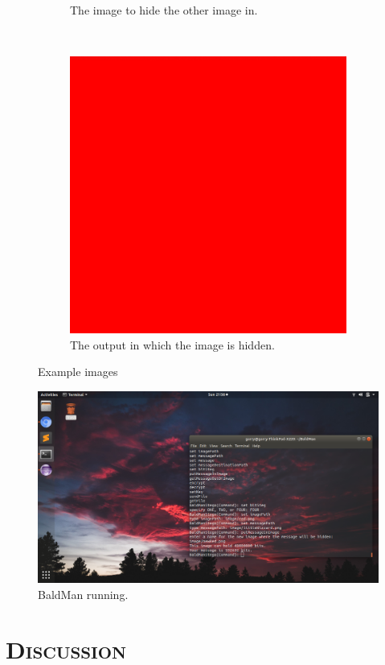 \documentclass[12pt]{article}
\begin{document}
\begin{figure}[h]
\begin{subfigure}[t]{0.3\textwidth}
			\caption{The image to hide the other image in.}
		\end{subfigure}
		~
		\begin{subfigure}[t]{0.3\textwidth}
			\includegraphics[width=\textwidth]{image/newRed.png}
			\caption{The output in which the image is hidden.}
		\end{subfigure}
		\caption{Example images}
	\end{figure}
	
	\begin{figure}[h]
		\centering
		\includegraphics[keepaspectratio=true, width=0.8\linewidth]{screenshot.png}
		\caption{BaldMan running.}
	\end{figure}
	
	\section[Discussion]{\Large{}\selectfont\scshape Discussion}
	
\end{document}
